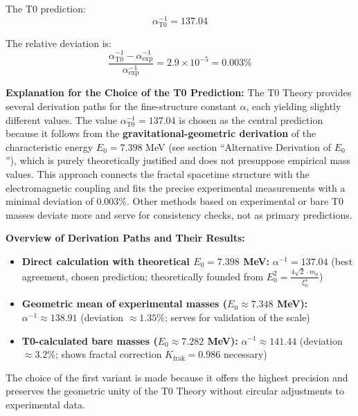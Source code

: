 \documentclass[12pt,a4paper]{article}
\newcommand{\xipar}{\xi_0}
\newcommand{\Kfrak}{K_{\text{frak}}}
\newcommand{\Ezero}{E_0}
\begin{document}
	The T0 prediction:
	\begin{equation}
		\alpha_{\text{T0}}^{-1} = 137.04
		\label{eq:alpha_t0}
	\end{equation}
	
	The relative deviation is:
	\begin{equation}
		\frac{\alpha_{\text{T0}}^{-1} - \alpha_{\text{exp}}^{-1}}{\alpha_{\text{exp}}^{-1}} = 2.9 \times 10^{-5} = 0.003\%
	\end{equation}
	
	\textbf{Explanation for the Choice of the T0 Prediction:} The T0 Theory provides several derivation paths for the fine-structure constant $\alpha$, each yielding slightly different values. The value $\alpha_{\text{T0}}^{-1} = 137.04$ is chosen as the central prediction because it follows from the \textbf{gravitational-geometric derivation} of the characteristic energy $\Ezero = 7.398$ MeV (see section ``Alternative Derivation of $\Ezero$''), which is purely theoretically justified and does not presuppose empirical mass values. This approach connects the fractal spacetime structure with the electromagnetic coupling and fits the precise experimental measurements with a minimal deviation of 0.003\%. Other methods based on experimental or bare T0 masses deviate more and serve for consistency checks, not as primary predictions.
	
	\begin{foundation}
		\textbf{Overview of Derivation Paths and Their Results:}
		\begin{itemize}
			\item \textbf{Direct calculation with theoretical $\Ezero = 7.398$ MeV:} $\alpha^{-1} = 137.04$ (best agreement, chosen prediction; theoretically founded from $\Ezero^2 = \frac{4\sqrt{2} \cdot m_\mu}{\xipar^4}$)
			\item \textbf{Geometric mean of experimental masses ($\Ezero \approx 7.348$ MeV):} $\alpha^{-1} \approx 138.91$ (deviation $\approx 1.35\%$; serves for validation of the scale)
			\item \textbf{T0-calculated bare masses ($\Ezero \approx 7.282$ MeV):} $\alpha^{-1} \approx 141.44$ (deviation $\approx 3.2\%$; shows fractal correction $\Kfrak = 0.986$ necessary)
		\end{itemize}
		
		The choice of the first variant is made because it offers the highest precision and preserves the geometric unity of the T0 Theory without circular adjustments to experimental data.
	\end{foundation}	
	
\end{document}
